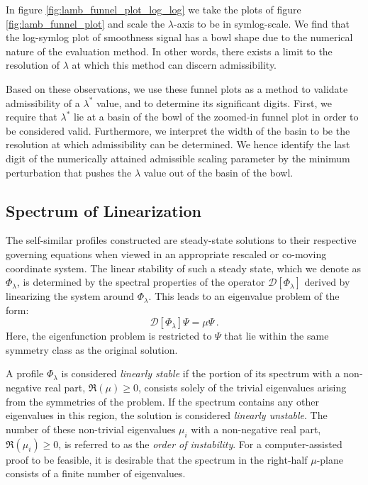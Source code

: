 \documentclass[fleqn,11pt]{wlscirep}
\begin{document}
In figure \ref{fig:lamb_funnel_plot_log_log} we take the plots of figure \ref{fig:lamb_funnel_plot} and scale the $\lambda$-axis to be in symlog-scale. We find that the log-symlog plot of smoothness signal has a bowl shape due to the numerical nature of the evaluation method. In other words, there exists a limit to the resolution of $\lambda$ at which this method can discern admissibility.

Based on these observations, we use these funnel plots as a method to validate admissibility of a $\lambda^*$ value, and to determine its significant digits. First, we require that $\lambda^*$ lie at a basin of the bowl of the zoomed-in funnel plot in order to be considered valid. Furthermore, we interpret the width of the basin to be the resolution at which admissibility can be determined. We hence identify the last digit of the numerically attained admissible scaling parameter by the minimum perturbation that pushes the $\lambda$ value out of the basin of the bowl.


\subsection*{Spectrum of Linearization}

The self-similar profiles constructed are steady-state solutions to their respective governing equations when viewed in an appropriate rescaled or co-moving coordinate system. The linear stability of such a steady state, which we denote as $\Phi_\lambda$, is determined by the spectral properties of the operator $\mathcal{D}[\Phi_\lambda]$ derived by linearizing the system around $\Phi_\lambda$. This leads to an eigenvalue problem of the form:
$$\mathcal{D}[\Phi_\lambda] \Psi = \mu \Psi \,.$$
Here, the eigenfunction problem is restricted to $\Psi$ that lie within the same symmetry class as the original solution.

A profile $\Phi_\lambda$ is considered \textit{linearly stable} if the portion of its spectrum with a non-negative real part, $\Re(\mu) \ge 0$, consists solely of the trivial eigenvalues arising from the symmetries of the problem. If the spectrum contains any other eigenvalues in this region, the solution is considered \textit{linearly unstable}. The number of these non-trivial eigenvalues $\mu_i$ with a non-negative real part, $\Re(\mu_i) \geq 0$, is referred to as the \textit{order of instability}. For a computer-assisted proof to be feasible, it is desirable that the spectrum in the right-half $\mu$-plane consists of a finite number of eigenvalues.
\end{document}

